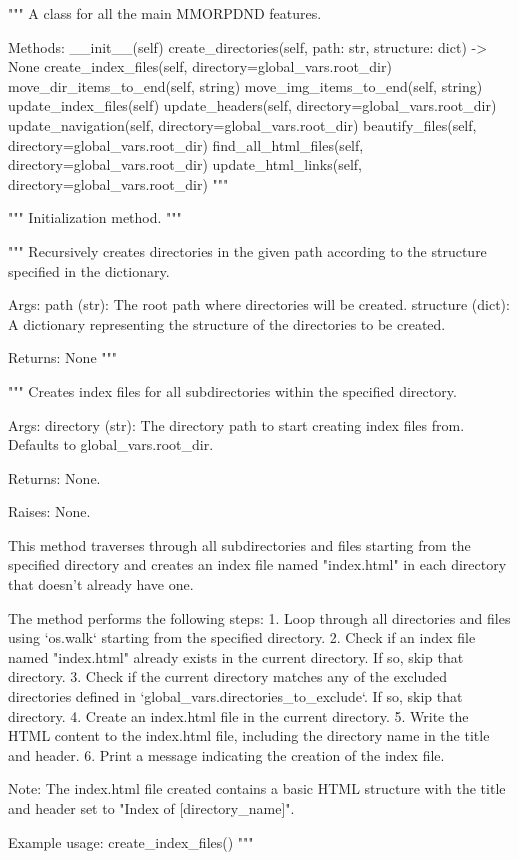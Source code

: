 \begin{classbox}
"""
A class for all the main MMORPDND features.

Methods:
	__init__(self)
	create_directories(self, path: str, structure: dict) -> None
	create_index_files(self, directory=global_vars.root_dir)
	move_dir_items_to_end(self, string)
	move_img_items_to_end(self, string)
	update_index_files(self)
	update_headers(self, directory=global_vars.root_dir)
	update_navigation(self, directory=global_vars.root_dir)
	beautify_files(self, directory=global_vars.root_dir)
	find_all_html_files(self, directory=global_vars.root_dir)
	update_html_links(self, directory=global_vars.root_dir)
"""
\end{classbox}


\begin{codebox}
"""
Initialization method.
"""
\end{codebox}


\begin{codebox}
"""
Recursively creates directories in the given path according to the structure specified in the dictionary.

Args:
	path (str): The root path where directories will be created.
	structure (dict): A dictionary representing the structure of the directories to be created.

Returns:
	None
"""
\end{codebox}


\begin{codebox}[MMORPDND.create\_index\_files(self, directory=global\_vars.root\_dir)]
"""
Creates index files for all subdirectories within the specified directory.

Args:
	directory (str): The directory path to start creating index files from. Defaults to global_vars.root_dir.

Returns:
	None.

Raises:
	None.

This method traverses through all subdirectories and files starting from the specified directory and creates an
index file named "index.html" in each directory that doesn't already have one.

The method performs the following steps:
	1. Loop through all directories and files using `os.walk` starting from the specified directory.
	2. Check if an index file named "index.html" already exists in the current directory. If so, skip that directory.
	3. Check if the current directory matches any of the excluded directories defined in `global_vars.directories_to_exclude`.
	If so, skip that directory.
	4. Create an index.html file in the current directory.
	5. Write the HTML content to the index.html file, including the directory name in the title and header.
	6. Print a message indicating the creation of the index file.

Note: 
	The index.html file created contains a basic HTML structure with the title and header set to "Index of [directory_name]".

Example usage:
	create_index_files()
"""
\end{codebox}


